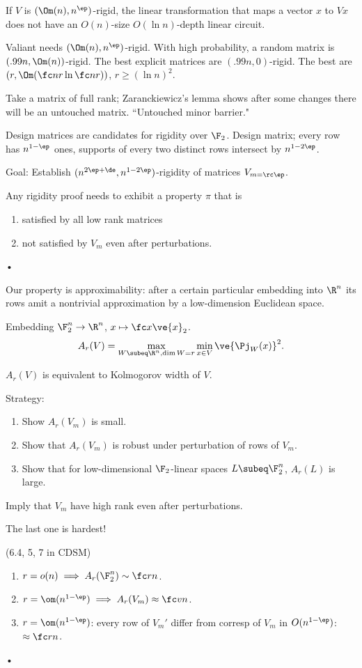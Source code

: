 If $V$ is $(\Om(n),n^\ep)$-rigid, the linear transformation that maps a vector $x$ to $Vx$ does not have an $O(n)$-size $O(\ln n)$-depth linear circuit.

Valiant needs $(\Om(n),n^\ep)$-rigid. With high probability, a random matrix is $(.99n,\Om(n))$-rigid.
The best explicit matrices are $(.99n,0)$-rigid. The best are $(r,\Om(\fc nr \ln \fc nr))$, $r\ge (\ln n)^2$.

Take a matrix of full rank; Zaranckiewicz's lemma shows after some changes there will be an untouched matrix. ``Untouched minor barrier."

Design matrices are candidates for rigidity over $\F_2$. Design matrix; every row has $n^{1-\ep}$ ones, supports of every two distinct rows intersect by $n^{1-2\ep}$.

Goal:  Establish $(n^{2\ep +\de},n^{1-2\ep})$-rigidity of matrices $V_{m=\rc\ep}$.

Any rigidity proof needs to exhibit a property $\pi$ that is
\begin{enumerate}
\item
satisfied by all low rank matrices
\item not satisfied by $V_m$ even after perturbations.
\end{enumerate}•

Our property is approximability: after a certain particular embedding into $\R^n$ its rows amit a nontrivial approximation by a low-dimension Euclidean space.

Embedding $\F_2^n\to \R^n$, $x\mapsto \fc x{\ve{x}_2}$.
\[
A_r(V)=\max_{W\subeq \R^n,\dim W=r} \min_{x\in V} \ve{\Pj_W(x)}^2.
\]

$A_r(V)$ is equivalent to Kolmogorov width of $V$.

Strategy:
\begin{enumerate}
\item
Show $A_r(V_m)$ is small.
\item
Show that $A_r(V_m)$ is robust under perturbation of rows of $V_m$.
\item
Show that for low-dimensional $\F_2$-linear spaces $L\subeq \F_2^n$, $A_r(L)$ is large.
\end{enumerate}
Imply that $V_m$ have high rank even after perturbations.

The last one is hardest!

(6.4, 5, 7 in CDSM)
\begin{enumerate}
\item
$r=o(n)\implies A_r(\F_2^n)\sim \fc rn$.
\item
$r=\om(n^{1-\ep})\implies A_r(V_m)\approx \fc v n$.
\item
$r=\om(n^{1-\ep})$: every row of $V_m'$ differ from corresp of $V_m$ in $O(n^{1-\ep})$: $\approx \fc rn$.
\end{enumerate}•

